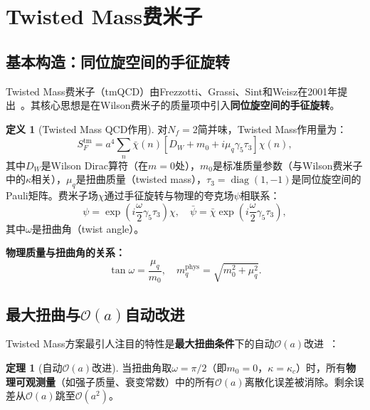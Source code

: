 \documentclass[12pt,a4paper]{ctexart}
\theoremstyle{definition}
\newtheorem{definition}{定义}[section]
\newtheorem{theorem}{定理}[section]
\begin{document}
\section{Twisted Mass费米子}

\subsection{基本构造：同位旋空间的手征旋转}

Twisted Mass费米子（tmQCD）由Frezzotti、Grassi、Sint和Weisz在2001年提出~\cite{Frezzotti2001tmQCD}。其核心思想是在Wilson费米子的质量项中引入\textbf{同位旋空间的手征旋转}。

\begin{definition}[Twisted Mass QCD作用]
对$N_f=2$简并味，Twisted Mass作用量为：
\begin{equation}
S_F^{\text{tm}} = a^4\sum_{n} \bar\chi(n)\left[ D_W + m_0 + i\mu_q\gamma_5\tau_3 \right]\chi(n),
\label{eq:tm_action}
\end{equation}
其中$D_W$是Wilson Dirac算符（在$m=0$处），$m_0$是标准质量参数（与Wilson费米子中的$\kappa$相关），$\mu_q$是扭曲质量（twisted mass），$\tau_3 = \operatorname{diag}(1,-1)$是同位旋空间的Pauli矩阵。费米子场$\chi$通过手征旋转与物理的夸克场$\psi$相联系：
\begin{equation}
\psi = \exp\left(i\frac{\omega}{2}\gamma_5\tau_3\right)\chi, \quad \bar\psi = \bar\chi\exp\left(i\frac{\omega}{2}\gamma_5\tau_3\right),
\label{eq:tm_rotation}
\end{equation}
其中$\omega$是扭曲角（twist angle）。
\end{definition}

\textbf{物理质量与扭曲角的关系：}
\begin{equation}
\tan\omega = \frac{\mu_q}{m_0}, \quad m_q^{\text{phys}} = \sqrt{m_0^2 + \mu_q^2}.
\label{eq:twist_angle}
\end{equation}

\subsection{最大扭曲与$\mathcal{O}(a)$自动改进}

Twisted Mass方案最引人注目的特性是\textbf{最大扭曲条件}下的自动$\mathcal{O}(a)$改进~\cite{Frezzotti2001tmQCD}：

\begin{theorem}[自动$\mathcal{O}(a)$改进]
当扭曲角取$\omega = \pi/2$（即$m_0 = 0$，$\kappa = \kappa_c$）时，所有\textbf{物理可观测量}（如强子质量、衰变常数）中的所有$\mathcal{O}(a)$离散化误差被消除。剩余误差从$\mathcal{O}(a)$跳至$\mathcal{O}(a^2)$。
\end{theorem}
\end{document}

